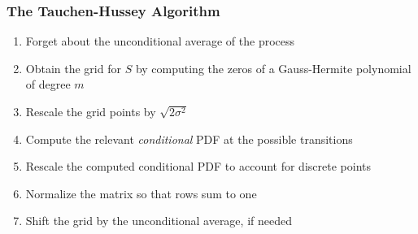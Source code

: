 \documentclass[10pt, aspectratio=1610, handout]{beamer}
\begin{document}
  \begin{frame}
    \frametitle{The Tauchen-Hussey Algorithm}

    \begin{enumerate}
      \item Forget about the unconditional average of the process \hfill {}
      \vfill\pause
      \item Obtain the grid for $S$ by computing the zeros of a Gauss-Hermite polynomial of degree $m$
      \vfill\pause
      \item Rescale the grid points by $\sqrt{2\sigma^2}$ \hfill {}
      \vfill\pause
      \item Compute the relevant \textit{conditional} PDF at the possible transitions \hfill {}
      \vfill\pause
      \item Rescale the computed conditional PDF to account for discrete points
      \vfill\pause
      \item Normalize the matrix so that rows sum to one
      \vfill\pause
      \item Shift the grid by the unconditional average, if needed
    \end{enumerate}

  \end{frame}
\end{document}
